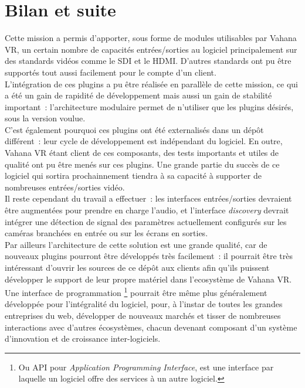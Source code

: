 \section{Bilan et suite}
Cette mission a permis d'apporter, sous forme de modules utilisables par Vahana VR,
un certain nombre de capacités entrées/sorties au logiciel principalement sur 
des standards vidéos comme le SDI et le HDMI. D'autres standards ont pu être supportés
tout aussi facilement pour le compte d'un client.\\
L'intégration de ces plugins a pu être réalisée en parallèle de cette mission, ce
qui a été un gain de rapidité de développement mais aussi un gain de stabilité important~:
l'architecture modulaire permet de n'utiliser que les plugins désirés, sous la version
voulue.\\
C'est également pourquoi ces plugins ont été externalisés dans un dépôt différent~:
leur cycle de développement est indépendant du logiciel. En outre, Vahana VR étant
client de ces composants, des tests importants et utiles de qualité ont pu être menés
sur ces plugins. Une grande partie du succès de ce logiciel qui sortira prochainnement
tiendra à sa capacité à supporter de nombreuses entrées/sorties vidéo.\\
\newline
Il reste cependant du travail a effectuer~: les interfaces entrées/sorties devraient
être augmentées pour prendre en charge l'audio, et l'interface \textit{discovery}
devrait intégrer une détection de signal des paramètres actuellement configurés
sur les caméras branchées en entrée ou sur les écrans en sorties.\\
Par ailleurs l'architecture de cette solution est une grande qualité, car de nouveaux
plugins pourront être développés très facilement~: il pourrait être très intéressant
d'ouvrir les sources de ce dépôt aux clients afin qu'ils puissent développer le
support de leur propre matériel dans l'ecosystème de Vahana VR. Une interface de programmation
\footnote{Ou API pour \textit{Application Programming Interface}, est une interface
par laquelle un logiciel offre des services à un autre logiciel\cite{interface-programmation}.} 
pourrait être même plus généralement développée pour l'intégralité du logiciel,
pour, à l'instar de toutes les grandes entreprises du web\cite{interface-programmation}, 
développer de nouveaux marchés et tisser de nombreuses interactions avec d'autres
écosystèmes\cite{valeur-api}\cite{value-apis}, chacun devenant composant d'un système
d'innovation et de croissance inter-logiciels.

